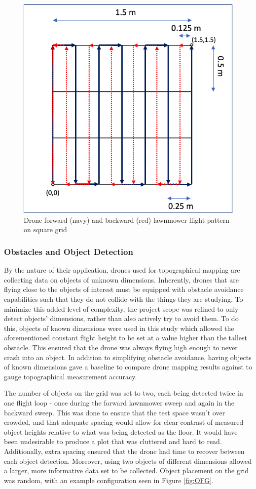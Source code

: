 \begin{figure}[H]
  \centering
  \includegraphics[width=0.6\linewidth, height=0.6\linewidth]{Technical/FP.png}  
  \caption{Drone forward (navy) and backward (red) lawnmower flight pattern on square grid}
  \label{fig:lawnmower}
\end{figure}

\subsubsection{Obstacles and Object Detection}
By the nature of their application, drones used for topographical mapping are collecting data on objects of unknown dimensions. Inherently, drones that are flying close to the objects of interest must be equipped with obstacle avoidance capabilities such that they do not collide with the things they are studying. To minimize this added level of complexity, the project scope was refined to only detect objects' dimensions, rather than also actively try to avoid them. To do this, objects of known dimensions were used in this study which allowed the aforementioned constant flight height to be set at a value higher than the tallest obstacle. This ensured that the drone was always flying high enough to never crash into an object. In addition to simplifying obstacle avoidance, having objects of known dimensions gave a baseline to compare drone mapping results against to gauge topographical measurement accuracy.

The number of objects on the grid was set to two, each being detected twice in one flight loop - once during the forward lawnmower sweep and again in the backward sweep. This was done to ensure that the test space wasn't over crowded, and that adequate spacing would allow for clear contrast of measured object heights relative to what was being detected as the floor. It would have been undesirable to produce a plot that was cluttered and hard to read. Additionally, extra spacing ensured that the drone had time to recover between each object detection. Moreover, using two objects of different dimensions allowed a larger, more informative data set to be collected. Object placement on the grid was random, with an example configuration seen in Figure \ref{fig:OFG}.


